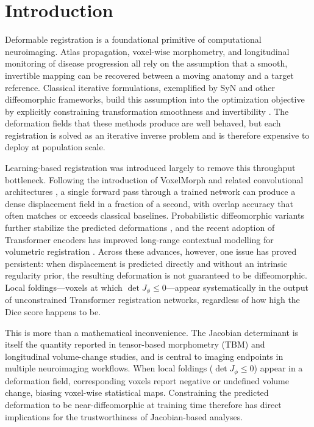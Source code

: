 \documentclass[jimaging,article,submit,pdftex,moreauthors]{Definitions/mdpi}
\begin{document}
\section{Introduction}

Deformable registration is a foundational primitive of computational neuroimaging. Atlas propagation, voxel-wise morphometry, and longitudinal monitoring of disease progression all rely on the assumption that a smooth, invertible mapping can be recovered between a moving anatomy and a target reference. Classical iterative formulations, exemplified by SyN and other diffeomorphic frameworks, build this assumption into the optimization objective by explicitly constraining transformation smoothness and invertibility \cite{avants2008ants,rueckert1999nonrigid,ashburner1999morphometry}. The deformation fields that these methods produce are well behaved, but each registration is solved as an iterative inverse problem and is therefore expensive to deploy at population scale.

Learning-based registration was introduced largely to remove this throughput bottleneck. Following the introduction of VoxelMorph and related convolutional architectures \cite{balakrishnan2019voxelmorph,kim2021cyclemorph}, a single forward pass through a trained network can produce a dense displacement field in a fraction of a second, with overlap accuracy that often matches or exceeds classical baselines. Probabilistic diffeomorphic variants further stabilize the predicted deformations \cite{dalca2019probreg}, and the recent adoption of Transformer encoders has improved long-range contextual modelling for volumetric registration \cite{chen2022transmorph,liu2021swin}. Across these advances, however, one issue has proved persistent: when displacement is predicted directly and without an intrinsic regularity prior, the resulting deformation is not guaranteed to be diffeomorphic. Local foldings---voxels at which \(\det J_\phi\le 0\)---appear systematically in the output of unconstrained Transformer registration networks, regardless of how high the Dice score happens to be.

This is more than a mathematical inconvenience. The Jacobian determinant is itself the quantity reported in tensor-based morphometry (TBM) and longitudinal volume-change studies, and is central to imaging endpoints in multiple neuroimaging workflows. When local foldings (\(\det J_\phi\le 0\)) appear in a deformation field, corresponding voxels report negative or undefined volume change, biasing voxel-wise statistical maps. Constraining the predicted deformation to be near-diffeomorphic at training time therefore has direct implications for the trustworthiness of Jacobian-based analyses.
\end{document}
